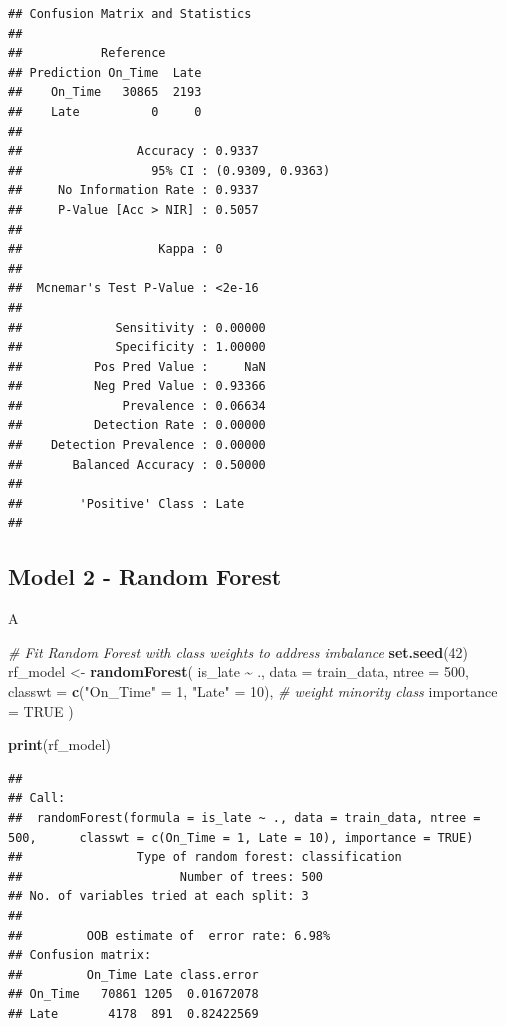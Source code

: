 \documentclass[
]{article}
\newenvironment{Shaded}{\begin{snugshade}}{\end{snugshade}}
\newcommand{\AttributeTok}[1]{\textcolor[rgb]{0.13,0.29,0.53}{#1}}
\newcommand{\CommentTok}[1]{\textcolor[rgb]{0.56,0.35,0.01}{\textit{#1}}}
\newcommand{\ConstantTok}[1]{\textcolor[rgb]{0.56,0.35,0.01}{#1}}
\newcommand{\DecValTok}[1]{\textcolor[rgb]{0.00,0.00,0.81}{#1}}
\newcommand{\FunctionTok}[1]{\textcolor[rgb]{0.13,0.29,0.53}{\textbf{#1}}}
\newcommand{\NormalTok}[1]{#1}
\newcommand{\OtherTok}[1]{\textcolor[rgb]{0.56,0.35,0.01}{#1}}
\newcommand{\SpecialCharTok}[1]{\textcolor[rgb]{0.81,0.36,0.00}{\textbf{#1}}}
\newcommand{\StringTok}[1]{\textcolor[rgb]{0.31,0.60,0.02}{#1}}
\begin{document}
\begin{verbatim}
## Confusion Matrix and Statistics
## 
##           Reference
## Prediction On_Time  Late
##    On_Time   30865  2193
##    Late          0     0
##                                           
##                Accuracy : 0.9337          
##                  95% CI : (0.9309, 0.9363)
##     No Information Rate : 0.9337          
##     P-Value [Acc > NIR] : 0.5057          
##                                           
##                   Kappa : 0               
##                                           
##  Mcnemar's Test P-Value : <2e-16          
##                                           
##             Sensitivity : 0.00000         
##             Specificity : 1.00000         
##          Pos Pred Value :     NaN         
##          Neg Pred Value : 0.93366         
##              Prevalence : 0.06634         
##          Detection Rate : 0.00000         
##    Detection Prevalence : 0.00000         
##       Balanced Accuracy : 0.50000         
##                                           
##        'Positive' Class : Late            
## 
\end{verbatim}

\subsection{Model 2 - Random Forest}\label{model-2---random-forest}

A

\begin{Shaded}
\begin{Highlighting}[]
\CommentTok{\# Fit Random Forest with class weights to address imbalance}
\FunctionTok{set.seed}\NormalTok{(}\DecValTok{42}\NormalTok{)}
\NormalTok{rf\_model }\OtherTok{\textless{}{-}} \FunctionTok{randomForest}\NormalTok{(}
\NormalTok{  is\_late }\SpecialCharTok{\textasciitilde{}}\NormalTok{ .,}
  \AttributeTok{data =}\NormalTok{ train\_data,}
  \AttributeTok{ntree =} \DecValTok{500}\NormalTok{,}
  \AttributeTok{classwt =} \FunctionTok{c}\NormalTok{(}\StringTok{"On\_Time"} \OtherTok{=} \DecValTok{1}\NormalTok{, }\StringTok{"Late"} \OtherTok{=} \DecValTok{10}\NormalTok{), }\CommentTok{\# weight minority class}
  \AttributeTok{importance =} \ConstantTok{TRUE}
\NormalTok{)}

\FunctionTok{print}\NormalTok{(rf\_model)}
\end{Highlighting}
\end{Shaded}

\begin{verbatim}
## 
## Call:
##  randomForest(formula = is_late ~ ., data = train_data, ntree = 500,      classwt = c(On_Time = 1, Late = 10), importance = TRUE) 
##                Type of random forest: classification
##                      Number of trees: 500
## No. of variables tried at each split: 3
## 
##         OOB estimate of  error rate: 6.98%
## Confusion matrix:
##         On_Time Late class.error
## On_Time   70861 1205  0.01672078
## Late       4178  891  0.82422569
\end{verbatim}
\end{document}
